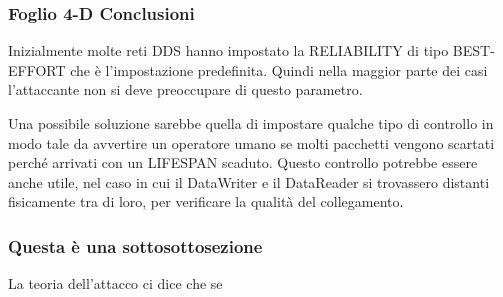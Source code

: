 \subsubsection{Foglio 4-D Conclusioni}
Inizialmente molte reti DDS hanno impostato la RELIABILITY
di tipo BEST-EFFORT che è l'impostazione predefinita. Quindi nella maggior parte
dei casi l'attaccante non si deve preoccupare di questo parametro.

Una possibile soluzione sarebbe quella di impostare qualche tipo di controllo
in modo tale da avvertire un operatore umano se molti pacchetti vengono
scartati perché arrivati con un LIFESPAN scaduto. Questo controllo potrebbe
essere anche utile, nel caso in cui il DataWriter e il DataReader si trovassero
distanti fisicamente tra di loro, per verificare la qualità del collegamento.








\subsubsection{Questa è una sottosottosezione}
La teoria dell'attacco ci dice che se 


\setlength{\arrayrulewidth}{1.0pt} %


